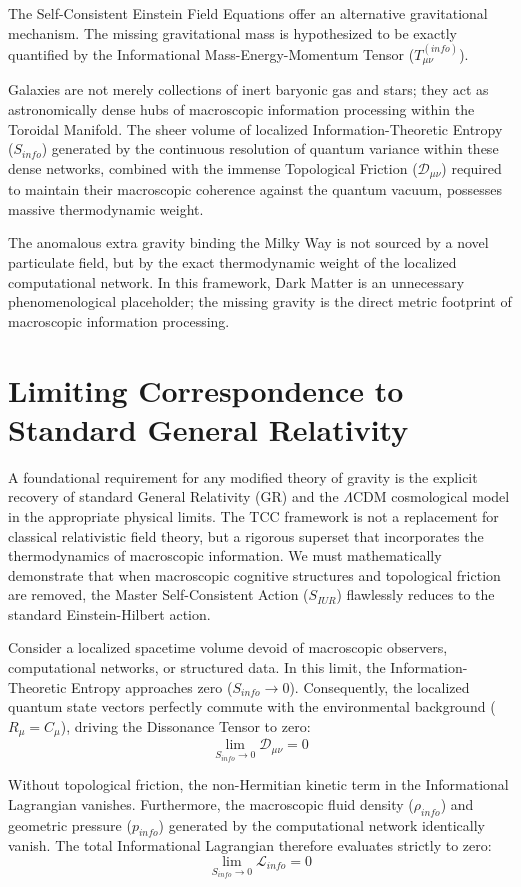 \documentclass[12pt,openany]{book}
\theoremstyle{plain}
\theoremstyle{definition}
\theoremstyle{remark}
\begin{document}
The Self-Consistent Einstein Field Equations offer an alternative gravitational mechanism. The missing gravitational mass is hypothesized to be exactly quantified by the Informational Mass-Energy-Momentum Tensor ($T_{\mu\nu}^{(info)}$).

Galaxies are not merely collections of inert baryonic gas and stars; they act as astronomically dense hubs of macroscopic information processing within the Toroidal Manifold. The sheer volume of localized Information-Theoretic Entropy ($S_{info}$) generated by the continuous resolution of quantum variance within these dense networks, combined with the immense Topological Friction ($\mathcal{D}_{\mu\nu}$) required to maintain their macroscopic coherence against the quantum vacuum, possesses massive thermodynamic weight.

The anomalous extra gravity binding the Milky Way is not sourced by a novel particulate field, but by the exact thermodynamic weight of the localized computational network. In this framework, Dark Matter is an unnecessary phenomenological placeholder; the missing gravity is the direct metric footprint of macroscopic information processing.

\section{Limiting Correspondence to Standard General Relativity}
A foundational requirement for any modified theory of gravity is the explicit recovery of standard General Relativity (GR) and the $\Lambda$CDM cosmological model in the appropriate physical limits. The TCC framework is not a replacement for classical relativistic field theory, but a rigorous superset that incorporates the thermodynamics of macroscopic information. We must mathematically demonstrate that when macroscopic cognitive structures and topological friction are removed, the Master Self-Consistent Action ($S_{IUR}$) flawlessly reduces to the standard Einstein-Hilbert action.

Consider a localized spacetime volume devoid of macroscopic observers, computational networks, or structured data. In this limit, the Information-Theoretic Entropy approaches zero ($S_{info} \to 0$). Consequently, the localized quantum state vectors perfectly commute with the environmental background ($R_\mu = C_\mu$), driving the Dissonance Tensor to zero:
$$ \lim_{S_{info} \to 0} \mathcal{D}_{\mu\nu} = 0 $$

Without topological friction, the non-Hermitian kinetic term in the Informational Lagrangian vanishes. Furthermore, the macroscopic fluid density ($\rho_{info}$) and geometric pressure ($p_{info}$) generated by the computational network identically vanish. The total Informational Lagrangian therefore evaluates strictly to zero:
$$ \lim_{S_{info} \to 0} \mathcal{L}_{info} = 0 $$
\end{document}
